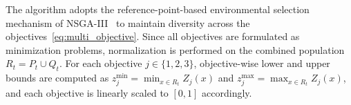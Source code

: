 \documentclass[a4paper,fleqn]{cas-sc}
\newcommand\todoi[1]{\todo[inline]{#1}}
\begin{document}


The algorithm adopts the reference-point-based environmental selection mechanism
of NSGA-III~\citep{deb2014nsga3} to maintain diversity across the objectives~\eqref{eq:multi_objective}.
Since all objectives are formulated as minimization problems, normalization is
performed on the combined population $R_t = P_t \cup Q_t$.
For each objective $j \in \{1,2,3\}$, objective-wise lower and upper bounds are
computed as
$z_j^{\min} = \min_{x \in R_t} Z_j(x)$ and
$z_j^{\max} = \max_{x \in R_t} Z_j(x)$,
and each objective is linearly scaled to $[0,1]$ accordingly.
\end{document}
